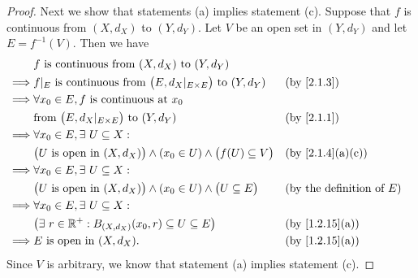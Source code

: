 \begin{proof}
  Next we show that statements (a) implies statement (c).
  Suppose that \(f\) is continuous from \((X, d_X)\) to \((Y, d_Y)\).
  Let \(V\) be an open set in \((Y, d_Y)\) and let \(E = f^{-1}(V)\).
  Then we have
  \begin{align*}
             & f \text{ is continuous from } (X, d_X) \text{ to } (Y, d_Y)                                                                          \\
    \implies & f|_{E} \text{ is continuous from } \big(E, d_X|_{E \times E}\big) \text{ to } (Y, d_Y)      &  & \text{(by \cref{2.1.3})}            \\
    \implies & \forall x_0 \in E, f \text{ is continuous at } x_0                                                                                   \\
             & \text{from } \big(E, d_X|_{E \times E}\big) \text{ to } (Y, d_Y)                            &  & \text{(by \cref{2.1.1})}            \\
    \implies & \forall x_0 \in E, \exists\ U \subseteq X :                                                                                          \\
             & \big(U \text{ is open in } (X, d_X)\big) \land (x_0 \in U) \land \big(f(U) \subseteq V\big) &  & \text{(by \cref{2.1.4}(a)(c))}      \\
    \implies & \forall x_0 \in E, \exists\ U \subseteq X :                                                                                          \\
             & \big(U \text{ is open in } (X, d_X)\big) \land (x_0 \in U) \land \big(U \subseteq E\big)    &  & \text{(by the definition of \(E\))} \\
    \implies & \forall x_0 \in E, \exists\ U \subseteq X :                                                                                          \\
             & \big(\exists\ r \in \R^+ : B_{(X, d_X)}(x_0, r) \subseteq U \subseteq E\big)                &  & \text{(by \cref{1.2.15}(a))}        \\
    \implies & E \text{ is open in } (X, d_X).                                                             &  & \text{(by \cref{1.2.15}(a))}
  \end{align*}
  Since \(V\) is arbitrary, we know that statement (a) implies statement (c).


\end{proof}

